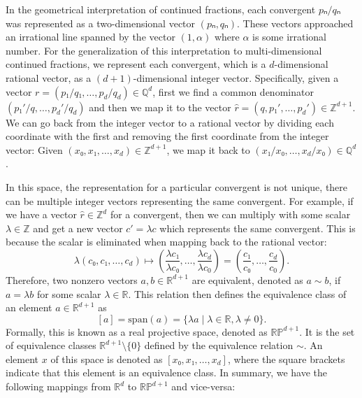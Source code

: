In the geometrical interpretation of continued fractions,
each convergent $pₙ/qₙ$ was represented as a two-dimensional vector $(pₙ, qₙ)$.
These vectors approached an irrational line spanned by the vector $(1, α)$ where
$α$ is some irrational number.
For the generalization of this interpretation to multi-dimensional continued
fractions, we represent each convergent, which is a $d$-dimensional rational vector,
as a $(d+1)$-dimensional integer vector.
Specifically, given a vector $r = (p₁/q₁, …, p_d/q_d) ∈ ℚ^d$, first we find a
common denominator $(p₁'/q, …, p_d'/q_d)$ and then we map it to the vector
$\hat r = (q, p₁', …, p_d') ∈ ℤ^{d+1}$.
We can go back from the integer vector to a rational vector by dividing each
coordinate with the first and removing the first coordinate from the integer
vector:
Given $(x₀, x₁, …, x_d) ∈ ℤ^{d+1}$, we map it back to $(x₁/x₀, …, x_d/x₀) ∈ ℚ^d$.

In this space, the representation for a particular convergent is not unique,
there can be multiple integer vectors representing the same convergent.
For example, if we have a vector $\hat r ∈ ℤ^d$ for a convergent,
then we can multiply with some scalar $λ ∈ ℤ$ and get a new vector $c' = λ c$
which represents the same convergent.
This is because the scalar is eliminated when mapping back to the rational vector:
\[
  λ (c₀, c₁, …, c_d)
  ↦ \left(\frac{λ c₁}{λ c₀}, …, \frac{λ c_d}{λ c_0} \right)
  = \left(\frac{c₁}{c₀}, …, \frac{c_d}{c_0} \right).
\]
Therefore, two nonzero vectors $a, b ∈ ℝ^{d+1}$ are equivalent,
denoted as $a \sim b$, if $a = λ b$ for some scalar $λ ∈ ℝ$.
This relation then defines the equivalence class of an element $a ∈ ℝ^{d+1}$ as
\[
  [a] = \mathrm{span}(a) = \{ λ a \mid λ ∈ ℝ, λ ≠ 0 \}.
\]
Formally, this is known as a real projective space, denoted as $\mathbb{RP}^{d+1}$.
It is the set of equivalence classes $ℝ^{d+1} \setminus \{0\}$ defined by the
equivalence relation $\sim$.
An element $x$ of this space is denoted as $[x₀, x₁, …, x_d]$,
where the square brackets indicate that this element is an equivalence
class.
In summary, we have the following mappings from $ℝ^d$ to $\mathbb{RP}^{d+1}$
and vice-versa:

\begin{center}
\end{center}

